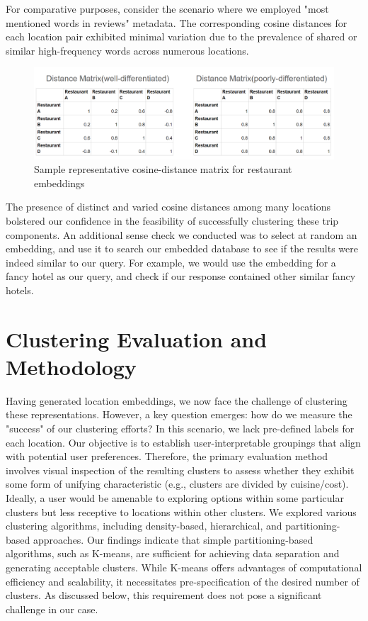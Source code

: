 \documentclass[12pt,a4paper]{report}
\begin{document}
For comparative purposes, consider the scenario where we employed "most mentioned words in reviews" metadata.  The corresponding cosine distances for each location pair exhibited minimal variation due to the prevalence of shared or similar high-frequency words across numerous locations.

\begin{figure}[H]
    \centering
    \includegraphics[scale=.8]{distancematrixex}
    \caption{Sample representative cosine-distance matrix for restaurant embeddings}
\end{figure}

The presence of distinct and varied cosine distances among many locations bolstered our confidence in the feasibility of successfully clustering these trip components. An additional sense check we conducted was to select at random an embedding, and use it to search our embedded database to see if the results were indeed similar to our query. For example, we would use the embedding for a fancy hotel as our query, and check if our response contained other similar fancy hotels.

\section{Clustering Evaluation and Methodology}

Having generated location embeddings, we now face the challenge of clustering these representations.  However, a key question emerges: how do we measure the "success" of our clustering efforts?  In this scenario, we lack pre-defined labels for each location.  Our objective is to establish user-interpretable groupings that align with potential user preferences.  Therefore, the primary evaluation method involves visual inspection of the resulting clusters to assess whether they exhibit some form of unifying characteristic (e.g., clusters are divided by cuisine/cost).  Ideally, a user would be amenable to exploring options within some particular clusters but less receptive to locations within other clusters.
We explored various clustering algorithms, including density-based, hierarchical, and partitioning-based approaches.  Our findings indicate that simple partitioning-based algorithms, such as K-means, are sufficient for achieving data separation and generating acceptable clusters.  While K-means offers advantages of computational efficiency and scalability, it necessitates pre-specification of the desired number of clusters.  As discussed below, this requirement does not pose a significant challenge in our case.
\end{document}
